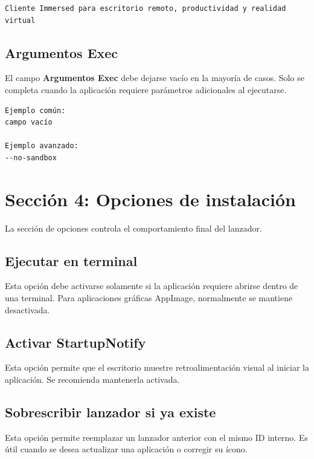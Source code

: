 \documentclass[11pt,a4paper]{article}
\begin{document}
\begin{lstlisting}[style=textstyle]
Cliente Immersed para escritorio remoto, productividad y realidad virtual
\end{lstlisting}

\subsection{Argumentos Exec}

El campo \textbf{Argumentos Exec} debe dejarse vacío en la mayoría de casos. Solo se completa cuando la aplicación requiere parámetros adicionales al ejecutarse.

\begin{lstlisting}[style=textstyle]
Ejemplo común:
campo vacío

Ejemplo avanzado:
--no-sandbox
\end{lstlisting}

\section{Sección 4: Opciones de instalación}

La sección de opciones controla el comportamiento final del lanzador.

\subsection{Ejecutar en terminal}

Esta opción debe activarse solamente si la aplicación requiere abrirse dentro de una terminal. Para aplicaciones gráficas AppImage, normalmente se mantiene desactivada.

\subsection{Activar StartupNotify}

Esta opción permite que el escritorio muestre retroalimentación visual al iniciar la aplicación. Se recomienda mantenerla activada.

\subsection{Sobrescribir lanzador si ya existe}

Esta opción permite reemplazar un lanzador anterior con el mismo ID interno. Es útil cuando se desea actualizar una aplicación o corregir su ícono.
\end{document}
